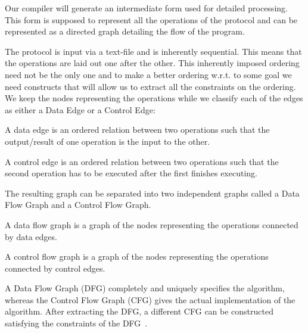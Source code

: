 Our compiler will generate an intermediate form used for detailed
processing. This form is supposed to represent all the operations of
the protocol and can be represented as a directed graph detailing the
flow of the program.

The protocol is input via a text-file and is inherently
sequential. This means that the operations are laid out one after the
other. This inherently imposed ordering need not be the only one and
to make a better ordering w.r.t. to some goal we need constructs that
will allow us to extract all the constraints on the ordering. We keep
the nodes representing the operations while we classify each of the
edges as either a Data Edge or a Control Edge:
\begin{defn}
  A data edge is an ordered relation between two operations such that
  the output/result of one operation is the input to the other.
\end{defn}
\begin{defn}
  A control edge is an ordered relation between two operations such
  that the second operation has to be executed after the first finishes
  executing.
\end{defn}

The resulting graph can be separated into two independent graphs called
a Data Flow Graph and a Control Flow Graph.

\begin{defn}
  A data flow graph is a graph of the nodes representing the
  operations connected by data edges.
\end{defn}

\begin{defn}
  A control flow graph is a graph of the nodes representing the
  operations connected by control edges.
\end{defn}

A Data Flow Graph (DFG) completely and uniquely specifies the
algorithm, whereas the Control Flow Graph (CFG) gives the actual
implementation of the algorithm. After extracting the DFG, a different
CFG can be constructed satisfying the constraints of the
DFG~\cite{Schaumont}.

